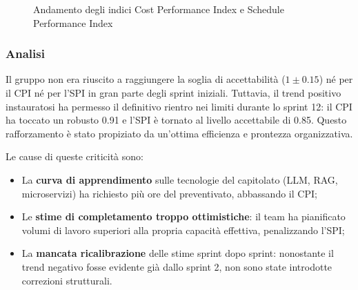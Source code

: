 \documentclass[a4paper,11pt,oneside]{scrartcl}
\begin{document}
\begin{figure}[H]
\centering
{}
\caption{Andamento degli indici Cost Performance Index e Schedule Performance Index}
\label{fig:cpi_spi}
\end{figure}

\subsubsection*{Analisi}

Il gruppo non era riuscito a raggiungere la soglia di accettabilità ($1 \pm 0.15$) né per il CPI né per l'SPI in gran parte degli sprint iniziali. Tuttavia, il trend positivo instauratosi ha permesso il definitivo rientro nei limiti durante lo sprint 12: il CPI ha toccato un robusto 0.91 e l'SPI è tornato al livello accettabile di 0.85. Questo rafforzamento è stato propiziato da un'ottima efficienza e prontezza organizzativa.

Le cause di queste criticità sono:
\begin{itemize}
    \item La \textbf{curva di apprendimento} sulle tecnologie del capitolato (LLM{\scriptsize{}}, RAG{\scriptsize{}}, microservizi{\scriptsize{}}) ha richiesto più ore del preventivato, abbassando il CPI;
    \item Le \textbf{stime di completamento troppo ottimistiche}: il team ha pianificato volumi di lavoro superiori alla propria capacità effettiva, penalizzando l'SPI;
    \item La \textbf{mancata ricalibrazione} delle stime sprint dopo sprint: nonostante il trend negativo fosse evidente già dallo sprint 2, non sono state introdotte correzioni strutturali.
\end{itemize}
\end{document}

